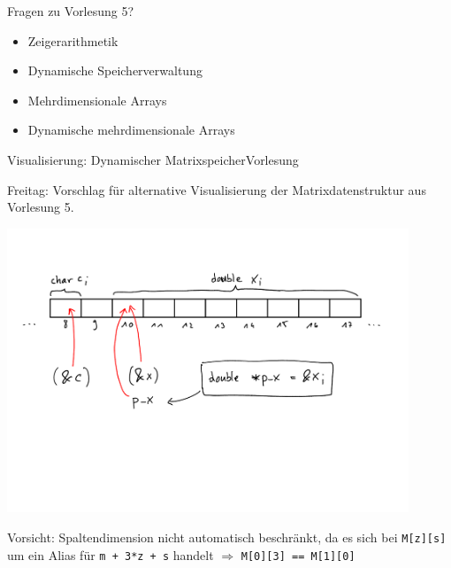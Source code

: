 \documentclass[xcolor=dvipsnames]{beamer}
\newcounter{lecturecounter}
\begin{document}

\begin{frame}[fragile]{Fragen zu Vorlesung 5?}
  \begin{itemize}
    \item{Zeigerarithmetik}
    \vspace{0.2cm}
    \item{Dynamische Speicherverwaltung}
    \vspace{0.2cm}
    \item{Mehrdimensionale Arrays}
    \vspace{0.2cm}
    \item{Dynamische mehrdimensionale Arrays}
  \end{itemize}
\end{frame}

\begin{frame}{Visualisierung: Dynamischer Matrixspeicher}{Vorlesung }
\begin{block}{}
  Freitag: Vorschlag für alternative Visualisierung der Matrixdatenstruktur aus Vorlesung 5.
\end{block}
\includegraphics[width=0.9\textwidth,page=6,trim=0 4cm 0 2cm,clip=true]{graphics/c_kurs_tafel}
\begin{block}{}
  Vorsicht: Spaltendimension nicht automatisch beschränkt, da es sich bei \texttt{M[z][s]} um ein Alias für \texttt{m + 3*z + s} handelt $\Rightarrow$ \texttt{M[0][3] == M[1][0]}
\end{block}
\end{frame}
\end{document}
